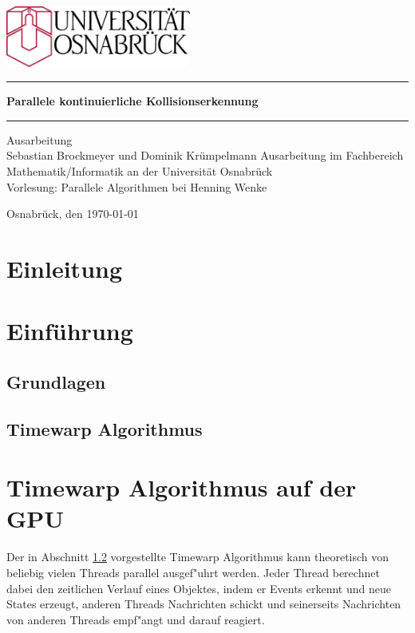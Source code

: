\documentclass{scrreprt}
\begin{document}
\begin{titlepage}
\thispagestyle{empty}
\vspace{10mm}
\begin{center}
\includegraphics[height=20mm]{unilogo.eps}
\vfill
\rule{\textwidth}{0.1mm}\vspace{5mm}
\Huge\textbf{Parallele kontinuierliche Kollisionserkennung}
\vspace{1mm}\rule{\textwidth}{0.1mm}
\vfill
\Large
Ausarbeitung\\
Sebastian Brockmeyer und Dominik Krümpelmann
\vfill
\normalsize
Ausarbeitung  im Fachbereich Mathematik/Informatik an der Universität Osnabrück \\
Vorlesung: Parallele Algorithmen bei Henning Wenke

Osnabrück, den \today
\end{center}
\end{titlepage}

\newpage
\mbox{}
\thispagestyle{empty}
\chapter*{Einleitung}
\setcounter{page}{1}

\newpage
\mbox{}
\thispagestyle{empty}
\newpage
\clearpage
\setcounter{page}{2}
\tableofcontents
\listoffigures
\newpage



\chapter{Einführung}
\section{Grundlagen}
\section{Timewarp Algorithmus}
\label{sec:TimewarpAlgoritmus}




\chapter{Timewarp Algorithmus auf der GPU}
Der in Abschnitt \ref{sec:TimewarpAlgoritmus} vorgestellte Timewarp Algorithmus kann theoretisch von beliebig vielen Threads
parallel ausgef"uhrt werden. Jeder Thread berechnet dabei den zeitlichen Verlauf eines Objektes, indem er Events erkennt
und neue States erzeugt, anderen Threads Nachrichten schickt und seinerseits Nachrichten von anderen Threads empf"angt
und darauf reagiert. 
\end{document}
